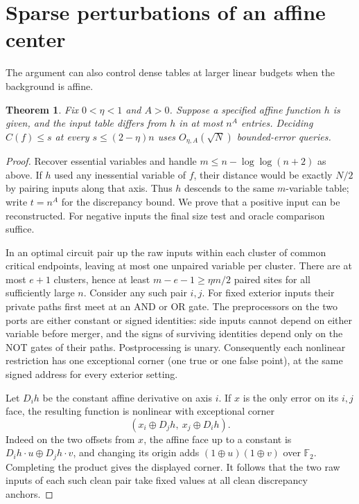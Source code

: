 \documentclass[11pt]{article}
\newtheorem{theorem}{Theorem}[section]
\begin{document}
\section{Sparse perturbations of an affine center}
The argument can also control dense tables at larger linear budgets when the background is affine.
\begin{theorem}\label{th:affine}
Fix $0<\eta<1$ and $A>0$. Suppose a specified affine function $h$ is given, and the input table differs from $h$ in at most $n^A$ entries. Deciding $C(f)\le s$ at every $s\le(2-\eta)n$ uses $O_{\eta,A}(\sqrt N)$ bounded-error queries.
\end{theorem}
\begin{proof}
Recover essential variables and handle $m\le n-\log\log(n+2)$ as above. If $h$ used any inessential variable of $f$, their distance would be exactly $N/2$ by pairing inputs along that axis. Thus $h$ descends to the same $m$-variable table; write $t=n^A$ for the discrepancy bound. We prove that a positive input can be reconstructed. For negative inputs the final size test and oracle comparison suffice.

In an optimal circuit pair up the raw inputs within each cluster of common critical endpoints, leaving at most one unpaired variable per cluster. There are at most $e+1$ clusters, hence at least $m-e-1\ge \eta m/2$ paired sites for all sufficiently large $n$. Consider any such pair $i,j$. For fixed exterior inputs their private paths first meet at an AND or OR gate. The preprocessors on the two ports are either constant or signed identities: side inputs cannot depend on either variable before merger, and the signs of surviving identities depend only on the NOT gates of their paths. Postprocessing is unary. Consequently each nonlinear restriction has one exceptional corner (one true or one false point), at the same signed address for every exterior setting.

Let $D_i h$ be the constant affine derivative on axis $i$. If $x$ is the only error on its $i,j$ face, the resulting function is nonlinear with exceptional corner
\[
                     (x_i\mathbin\oplus D_jh,\ x_j\mathbin\oplus D_ih).
\]
Indeed on the two offsets from $x$, the affine face up to a constant is $D_i h\cdot u\mathbin\oplus D_jh\cdot v$, and changing its origin adds $(1\mathbin\oplus u)(1\mathbin\oplus v)$ over $\mathbb F_2$. Completing the product gives the displayed corner. It follows that the two raw inputs of each such clean pair take fixed values at all clean discrepancy anchors.


\end{proof}
\end{document}
